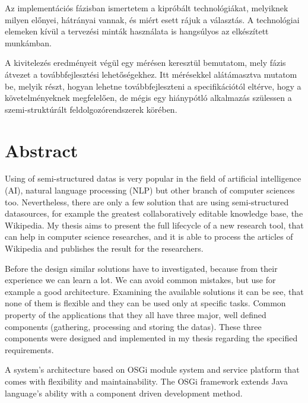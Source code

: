 Az implementációs fázisban ismertetem a kipróbált technológiákat, melyiknek milyen előnyei, hátrányai vannak, és miért esett rájuk a választás. A technológiai elemeken kívül a tervezési minták használata is hangsúlyos az elkészített munkámban.

A kivitelezés eredményeit végül egy mérésen keresztül bemutatom, mely fázis átvezet a továbbfejlesztési lehetőségekhez. Itt mérésekkel alátámasztva mutatom be, melyik részt, hogyan lehetne továbbfejleszteni a specifikációtól eltérve, hogy a követelményeknek megfelelően, de mégis egy hiánypótló alkalmazás szülessen a szemi-struktúrált feldolgozórendszerek körében.

\vfill

\chapter*{Abstract}

Using of semi-structured datas is very popular in the field of artificial intelligence (AI), natural language processing (NLP) but other branch of computer sciences too. Nevertheless, there are only a few solution that are using semi-structured datasources, for example the greatest collaboratively editable knowledge base, the Wikipedia. My thesis aims to present the full lifecycle of a new research tool, that can help in computer science researches, and it is able to process the articles of Wikipedia and publishes the result for the researchers.

Before the design similar solutions have to investigated, because from their experience we can learn a lot. We can avoid common mistakes, but use for example a good architecture. Examining the available solutions it can be see, that none of them is flexible and they can be used only at specific tasks. Common property of the applications that they all have three major, well defined components (gathering, processing and storing the datas). These three components were designed and implemented in my thesis regarding the specified requirements.

A system's architecture based on OSGi module system and service platform that comes with flexibility and maintainability. The OSGi framework extends Java language's ability with a component driven development method.

